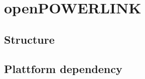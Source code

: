 \chapter{openPOWERLINK}
\label{cha:oplk}

\section{Structure}
\label{sec:oplk_structure}

\section{Plattform dependency}
\label{sec:oplk_platform}